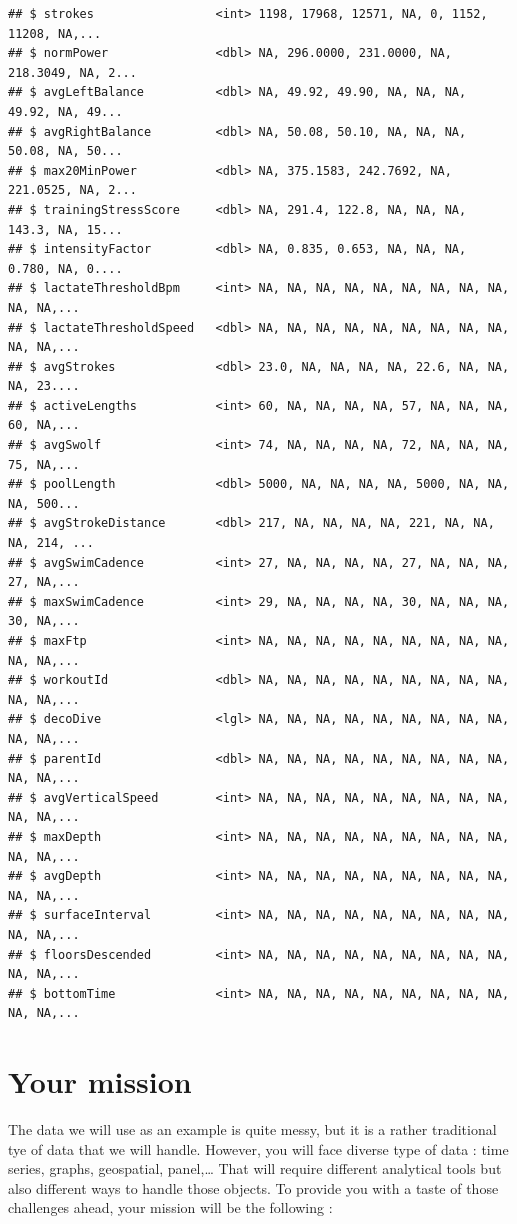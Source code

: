 \documentclass[
]{book}
\begin{document}
\begin{verbatim}
## $ strokes                 <int> 1198, 17968, 12571, NA, 0, 1152, 11208, NA,...
## $ normPower               <dbl> NA, 296.0000, 231.0000, NA, 218.3049, NA, 2...
## $ avgLeftBalance          <dbl> NA, 49.92, 49.90, NA, NA, NA, 49.92, NA, 49...
## $ avgRightBalance         <dbl> NA, 50.08, 50.10, NA, NA, NA, 50.08, NA, 50...
## $ max20MinPower           <dbl> NA, 375.1583, 242.7692, NA, 221.0525, NA, 2...
## $ trainingStressScore     <dbl> NA, 291.4, 122.8, NA, NA, NA, 143.3, NA, 15...
## $ intensityFactor         <dbl> NA, 0.835, 0.653, NA, NA, NA, 0.780, NA, 0....
## $ lactateThresholdBpm     <int> NA, NA, NA, NA, NA, NA, NA, NA, NA, NA, NA,...
## $ lactateThresholdSpeed   <dbl> NA, NA, NA, NA, NA, NA, NA, NA, NA, NA, NA,...
## $ avgStrokes              <dbl> 23.0, NA, NA, NA, NA, 22.6, NA, NA, NA, 23....
## $ activeLengths           <int> 60, NA, NA, NA, NA, 57, NA, NA, NA, 60, NA,...
## $ avgSwolf                <int> 74, NA, NA, NA, NA, 72, NA, NA, NA, 75, NA,...
## $ poolLength              <dbl> 5000, NA, NA, NA, NA, 5000, NA, NA, NA, 500...
## $ avgStrokeDistance       <dbl> 217, NA, NA, NA, NA, 221, NA, NA, NA, 214, ...
## $ avgSwimCadence          <int> 27, NA, NA, NA, NA, 27, NA, NA, NA, 27, NA,...
## $ maxSwimCadence          <int> 29, NA, NA, NA, NA, 30, NA, NA, NA, 30, NA,...
## $ maxFtp                  <int> NA, NA, NA, NA, NA, NA, NA, NA, NA, NA, NA,...
## $ workoutId               <dbl> NA, NA, NA, NA, NA, NA, NA, NA, NA, NA, NA,...
## $ decoDive                <lgl> NA, NA, NA, NA, NA, NA, NA, NA, NA, NA, NA,...
## $ parentId                <dbl> NA, NA, NA, NA, NA, NA, NA, NA, NA, NA, NA,...
## $ avgVerticalSpeed        <int> NA, NA, NA, NA, NA, NA, NA, NA, NA, NA, NA,...
## $ maxDepth                <int> NA, NA, NA, NA, NA, NA, NA, NA, NA, NA, NA,...
## $ avgDepth                <int> NA, NA, NA, NA, NA, NA, NA, NA, NA, NA, NA,...
## $ surfaceInterval         <int> NA, NA, NA, NA, NA, NA, NA, NA, NA, NA, NA,...
## $ floorsDescended         <int> NA, NA, NA, NA, NA, NA, NA, NA, NA, NA, NA,...
## $ bottomTime              <int> NA, NA, NA, NA, NA, NA, NA, NA, NA, NA, NA,...
\end{verbatim}

\hypertarget{your-mission}{%
\section{Your mission}\label{your-mission}}

The data we will use as an example is quite messy, but it is a rather traditional tye of data that we will handle. However, you will face diverse type of data : time series, graphs, geospatial, panel,\ldots{} That will require different analytical tools but also different ways to handle those objects. To provide you with a taste of those challenges ahead, your mission will be the following :
\end{document}
